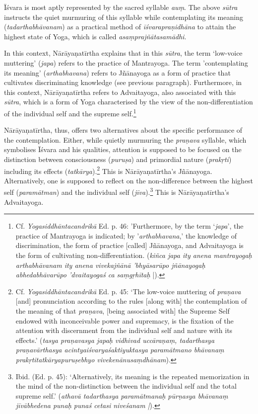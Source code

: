 Īśvara is most aptly represented by the sacred syllable \textit{auṃ}. The above \textit{sūtra} instructs the quiet murmuring of this syllable while contemplating its meaning (\textit{tadarthabhāvanam}) as a practical method of \textit{īśvarapraṇidhāna} to attain the highest state of Yoga, which is called \textit{asaṃprajñātasamādhi}.

In this context, Nārāyaṇatīrtha explains that in this \textit{sūtra}, the term `low-voice muttering' (\textit{japa}) refers to the practice of Mantrayoga. The term 'contemplating its meaning' (\textit{arthabhavana}) refers to Jñānayoga as a form of practice that cultivates discriminating knowledge (see previous paragraph). Furthermore, in this context, Nārāyaṇatīrtha refers to Advaitayoga, also associated with this \textit{sūtra}, which is a form of Yoga characterised by the view of the non-differentiation of the individual self and the supreme self.\footnote{Cf. \textit{Yogasiddhāntacandrikā} Ed. p. 46: 'Furthermore, by the term `\textit{japa}', the practice of Mantrayoga is indicated; by '\textit{arthabhavana},' the knowledge of discrimination, the form of practice [called] Jñānayoga, and Advaitayoga is the form of cultivating non-differentiation. (\textit{kiñca japa ity anena mantrayogaḥ arthabhāvanam ity anena vivekajñānā 'bhyāsarūpo jñānayogaḥ abhedabhāvarūpo 'dvaitayogaś ca saṃgṛhītaḥ} |).}

Nārāyaṇatīrtha, thus, offers two alternatives about the specific performance of the contemplation. Either, while quietly murmuring the \textit{praṇava} syllable, which symbolises Īśvara and his qualities, attention is supposed to be focused on the distinction between consciousness (\textit{puruṣa}) and primordial nature (\textit{prakṛti}) including its effects (\textit{tatkārya}).\footnote{Cf. \textit{Yogasiddhāntacandrikā} Ed. p. 45: `The low-voice muttering of \textit{praṇava} [and] pronunciation according to the rules [along with] the contemplation of the meaning of that \textit{praṇava}, [being associated with] the Supreme Self endowed with inconceivable power and supremacy, is the fixation of the attention with discernment from the individual self and nature with its effects.' (\textit{tasya praṇavasya japaḥ vidhivad uccāraṇaṃ, tadarthasya praṇavārthasya acintyaiśvaryaśaktiyuktasya paramātmano bhāvanaṃ prakṛtitatkāryapuruṣebhyo vivekenānusaṃdhānam}).} This is Nārāyaṇatīrtha's Jñānayoga. Alternatively, one is supposed to reflect on the non-difference between the highest self (\textit{paramātman}) and the individual self (\textit{jīva}).\footnote{Ibid. (Ed. p. 45): `Alternatively, its meaning is the repeated memorization in the mind of the non-distinction between the individual self and the total supreme self.' (\textit{athavā tadarthasya paramātmanaḥ pūrṇasya bhāvanaṃ jīvābhedena punaḥ punaś cetasi niveśanam |}).} This is Nārāyaṇatīrtha's Advaitayoga.

